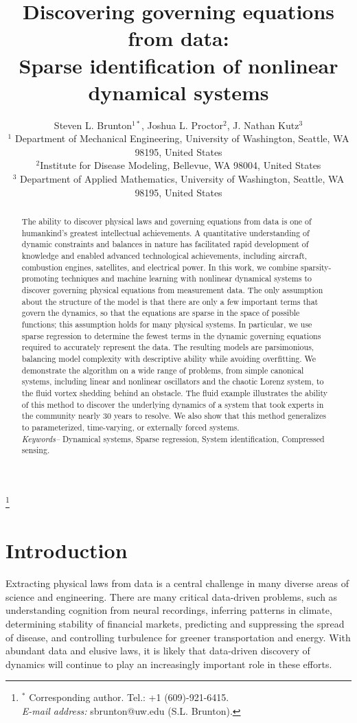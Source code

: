 \documentclass[onecolumn,11pt]{article}
\title{\huge{ Discovering governing equations from data:} \\ \vspace{.1in} 
\Large{Sparse identification of nonlinear dynamical systems}}
\author{Steven L. Brunton$^{1*}$, Joshua L. Proctor$^2$, J. Nathan Kutz$^3$\\
\footnotesize{$^1$ Department of Mechanical Engineering, University of Washington, Seattle, WA 98195, United States}\\
\footnotesize{$^2$Institute for Disease Modeling, Bellevue, WA 98004, United States}\\ 
\footnotesize{$^3$ Department of Applied Mathematics, University of Washington, Seattle, WA 98195, United States}\\
}
\date{}
\newcommand\blfootnote[1]{%
  \begingroup
  \renewcommand\thefootnote{}\footnote{#1}%
  \addtocounter{footnote}{-1}%
  \endgroup
}
\begin{document}
\maketitle
\blfootnote{$^*$ Corresponding author. Tel.: +1 (609)-921-6415.\\ {\indent\emph{E-mail address:} sbrunton@uw.edu (S.L. Brunton).}}
\vspace{-.2in}
\begin{abstract}
The ability to discover physical laws and governing equations from data is one of humankind's greatest intellectual achievements.  
A quantitative understanding of dynamic constraints and balances in nature has facilitated rapid development of knowledge and enabled advanced technological achievements, including aircraft, combustion engines, satellites, and electrical power.  
In this work, we combine sparsity-promoting techniques and machine learning with nonlinear dynamical systems to discover governing physical equations from measurement data.  
The only assumption about the structure of the model is that there are only a few important terms that govern the dynamics, so that the equations are sparse in the space of possible functions; this assumption holds for many physical systems. 
In particular, we use sparse regression to determine the fewest terms in the dynamic governing equations required to accurately represent the data. 
The resulting models are parsimonious, balancing model complexity with descriptive ability while avoiding overfitting.  
We demonstrate the algorithm on a wide range of problems, from simple canonical systems, including linear and nonlinear oscillators and the chaotic Lorenz system, to the fluid vortex shedding behind an obstacle.  The fluid example illustrates the ability of this method to discover the underlying dynamics of a system that took experts in the community nearly 30 years to resolve.  We also show that this method generalizes to parameterized, time-varying, or externally forced systems.\\


\noindent\emph{Keywords--}
Dynamical systems,
Sparse regression,
System identification,
Compressed sensing.
\end{abstract}


\section{Introduction}\label{sec:introduction}
Extracting physical laws from data is a central challenge in many diverse areas of science and engineering.  
There are many critical data-driven problems, such as understanding cognition from neural recordings, inferring patterns in climate, determining stability of financial markets, predicting and suppressing the spread of disease, and controlling turbulence for greener transportation and energy.  With abundant data and elusive laws, it is likely that data-driven discovery of {dynamics} will continue to play an increasingly important role in these efforts.
\end{document}
